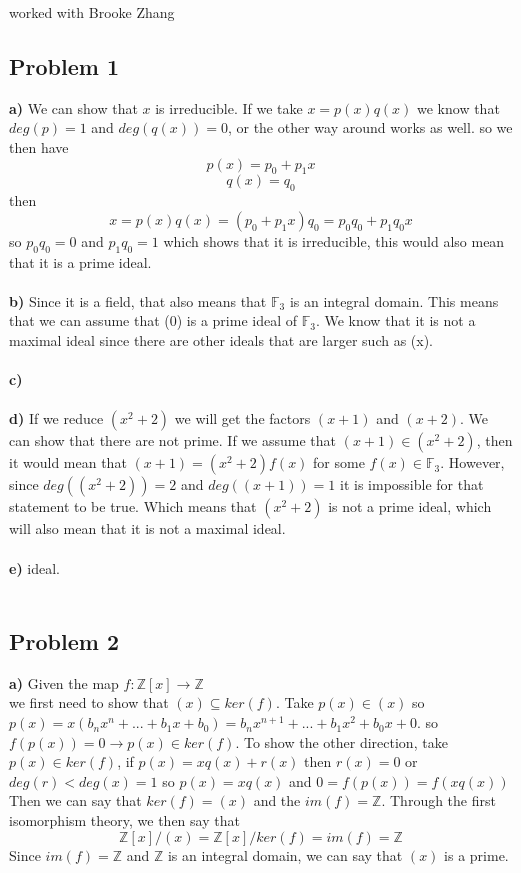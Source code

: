 \documentclass[12pt]{article}
\newcommand{\Z}{\mathbb{Z}}
\newcommand{\F}{\mathbb{F}}
\begin{document}
worked with Brooke Zhang
\subsection*{Problem 1}
\textbf{a) } We can show that $x$ is irreducible. If we take $x = p(x)q(x)$ we know that $deg(p) = 1$ and $deg(q(x)) = 0$, or the other way around works as well. so we then have
\[ p(x) = p_0 + p_1x \]
\[ q(x) = q_0 \]
then
\[ x = p(x)q(x) = (p_0 + p_1x)q_0 = p_0q_0 + p_1q_0x\]
so $p_0q_0 = 0$ and $p_1q_0 = 1$ which shows that it is irreducible, this would also mean that it is a prime ideal. \\\\
\textbf{b) } Since it is a field, that also means that $\F_3$ is an integral domain. This means that we can assume that (0) is a prime ideal of $\F_3$. We know that it is not a maximal ideal since there are other ideals that are larger such as (x).\\\\
\textbf{c) } \\\\
\textbf{d) } If we reduce $(x^2 + 2)$ we will get the factors $(x+1)$ and $(x+2)$. We can show that there are not prime. If we assume that $(x+1) \in (x^2 + 2)$, then it would mean that $(x+1) = (x^2 + 2)f(x)$ for some $f(x) \in \F_3$. However, since $deg((x^2 + 2)) = 2$ and $deg((x+1)) = 1$ it is impossible for that statement to be true. Which means that $(x^2 + 2)$ is not a prime ideal, which will also mean that it is not a maximal ideal.\\\\
\textbf{e) }  ideal.\\\\
\subsection*{Problem 2}
\textbf{a) } Given the map $f: \Z[x] \rightarrow \Z$ \\
we first need to show that $(x) \subseteq ker(f)$. Take $p(x) \in (x)$ so $p(x) = x(b_nx^n+...+b_1x+b_0) = b_nx^{n+1}+...+b_1x^2+b_0x + 0$. so $f(p(x)) = 0 \rightarrow p(x) \in ker(f)$. To show the other direction, take $p(x) \in ker(f)$, if $p(x) = xq(x) + r(x)$ then $r(x) = 0$ or $deg(r) < deg(x) = 1$ so $p(x) = xq(x)$ and $0 = f(p(x)) = f(xq(x))$ 
Then we can say that $ker(f) = (x)$ and the $im(f) = \Z$. Through the first isomorphism theory, we then say that 
\[ \Z[x]/(x)  = \Z[x]/ker(f) = im(f) = \Z \]
Since $im(f) = \Z$ and $\Z$ is an integral domain, we can say that $(x)$ is a prime. \\\\
\end{document}
